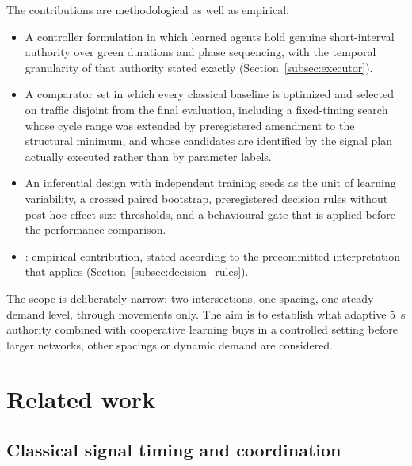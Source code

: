 \documentclass[review,12pt]{elsarticle}
\newcommand{\TBD}[1]{\textcolor{red}{\texttt{\detokenize{#1}}}}
\begin{document}
The contributions are methodological as well as empirical:
\begin{itemize}
\item A controller formulation in which learned agents hold genuine
short-interval authority over green durations and phase sequencing,
with the temporal granularity of that authority stated exactly
(Section~\ref{subsec:executor}).
\item A comparator set in which every classical baseline is optimized
and selected on traffic disjoint from the final evaluation, including a
fixed-timing search whose cycle range was extended by preregistered
amendment to the structural minimum, and whose candidates are
identified by the signal plan actually executed rather than by
parameter labels.
\item An inferential design with independent training seeds as the unit
of learning variability, a crossed paired bootstrap, preregistered
decision rules without post-hoc effect-size thresholds, and a
behavioural gate that is applied before the performance comparison.
\item \TBD{TBD_AFTER_FINAL_EVALUATION}: empirical contribution, stated
according to the precommitted interpretation that applies
(Section~\ref{subsec:decision_rules}).
\end{itemize}

The scope is deliberately narrow: two intersections, one spacing, one
steady demand level, through movements only. The aim is to establish
what adaptive 5~s authority combined with cooperative learning buys in
a controlled setting before larger networks, other spacings or dynamic
demand are considered.

\section{Related work}
\label{sec:related}

\subsection{Classical signal timing and coordination}
\label{subsec:lit_classical}
\end{document}
